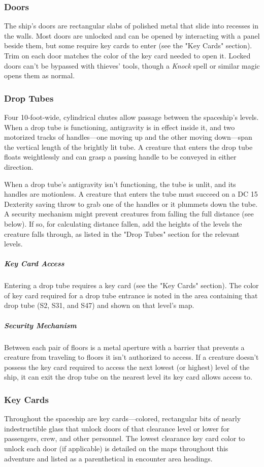 \documentclass[10pt,a4paper,twoside,bg=print,twocolumn,openany,nodeprecatedcode]{dndbook}
\begin{document}
\subsubsection{Doors}
The ship's doors are rectangular slabs of polished metal that slide into recesses in the walls. Most doors are unlocked and can be opened by interacting with a panel beside them, but some require key cards to enter (see the "Key Cards" section). Trim on each door matches the color of the key card needed to open it. Locked doors can't be bypassed with thieves' tools, though a \textit{Knock} spell or similar magic opens them as normal.

\subsubsection{Drop Tubes}
Four 10-foot-wide, cylindrical chutes allow passage between the spaceship's levels. When a drop tube is functioning, antigravity is in effect inside it, and two motorized tracks of handles—one moving up and the other moving down—span the vertical length of the brightly lit tube. A creature that enters the drop tube floats weightlessly and can grasp a passing handle to be conveyed in either direction.

When a drop tube's antigravity isn't functioning, the tube is unlit, and its handles are motionless. A creature that enters the tube must succeed on a DC 15 Dexterity saving throw to grab one of the handles or it plummets down the tube. A security mechanism might prevent creatures from falling the full distance (see below). If so, for calculating distance fallen, add the heights of the levels the creature falls through, as listed in the "Drop Tubes" section for the relevant levels.

\subparagraph{Key Card Access}
Entering a drop tube requires a key card (see the "Key Cards" section). The color of key card required for a drop tube entrance is noted in the area containing that drop tube (S2, S31, and S47) and shown on that level's map.

\subparagraph{Security Mechanism}
Between each pair of floors is a metal aperture with a barrier that prevents a creature from traveling to floors it isn't authorized to access. If a creature doesn't possess the key card required to access the next lowest (or highest) level of the ship, it can exit the drop tube on the nearest level its key card allows access to.

\subsubsection{Key Cards}
Throughout the spaceship are key cards—colored, rectangular bits of nearly indestructible glass that unlock doors of that clearance level or lower for passengers, crew, and other personnel. The lowest clearance key card color to unlock each door (if applicable) is detailed on the maps throughout this adventure and listed as a parenthetical in encounter area headings.
\end{document}
